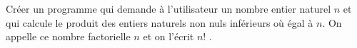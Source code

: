 
Créer un programme qui demande à l'utilisateur un nombre entier naturel $n$ et qui calcule le produit des entiers naturels non nuls inférieurs où égal à $n$. On appelle ce nombre factorielle $n$ et on l'écrit $n!$ .